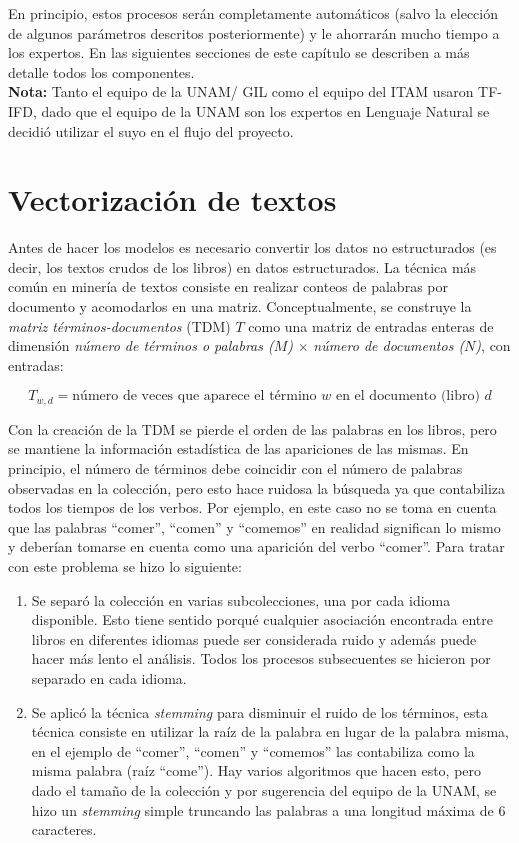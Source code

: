 En principio, estos procesos serán completamente automáticos (salvo la elección de algunos parámetros descritos posteriormente) y le ahorrarán mucho tiempo a los expertos. En las siguientes secciones de este capítulo se describen a más detalle todos los componentes.\\

\textbf{Nota:} Tanto el equipo de la UNAM/ GIL como el equipo del ITAM usaron TF-IFD, dado que el equipo de la UNAM son los expertos en Lenguaje Natural se decidió utilizar el suyo en el flujo del proyecto.

\section{Vectorización de textos}

Antes de hacer los modelos es necesario convertir los datos no estructurados (es decir, los textos crudos de los libros) en datos estructurados. La técnica más común en minería de textos consiste en realizar conteos de palabras por documento y acomodarlos en una matriz. Conceptualmente, se construye la \emph{matriz términos-documentos} (TDM) $T$ como una matriz de entradas enteras de dimensión \emph{número de términos o palabras ($M$)} $\times$ \emph{número de documentos ($N$)}, con entradas:

$$
T_{w,d} = \text{número de veces que aparece el término } w \text{ en el documento (libro) } d
$$

Con la creación de la TDM se pierde el orden de las palabras en los libros, pero se mantiene la información estadística de las apariciones de las mismas. En principio, el número de términos debe coincidir con el número de palabras observadas en la colección, pero esto hace ruidosa la búsqueda ya que contabiliza todos los tiempos de los verbos. Por ejemplo, en este caso no se toma en cuenta que las palabras ``comer'', ``comen'' y ``comemos'' en realidad significan lo mismo y deberían tomarse en cuenta como una aparición del verbo ``comer''. Para tratar con este problema se hizo lo siguiente:

\begin{enumerate}
    \item Se separó la colección en varias subcolecciones, una por cada idioma disponible. Esto tiene sentido porqué cualquier asociación encontrada entre libros en diferentes idiomas puede ser considerada ruido y además puede hacer más lento el análisis. Todos los procesos subsecuentes se hicieron por separado en cada idioma.
    \item Se aplicó la técnica \emph{stemming} para disminuir el ruido de los términos, esta técnica consiste en utilizar la raíz de la palabra en lugar de la palabra misma, en el ejemplo de ``comer'', ``comen'' y ``comemos'' las contabiliza como la misma palabra (raíz ``come''). Hay varios algoritmos que hacen esto, pero dado el tamaño de la colección y por sugerencia del equipo de la UNAM, se hizo un \emph{stemming} simple truncando las palabras a una longitud máxima de 6 caracteres.
\end{enumerate}

